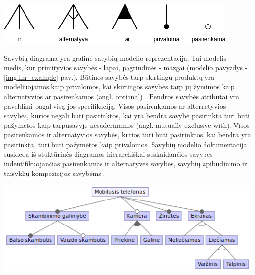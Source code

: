 \documentclass{VUMIFPSkursinis}
\begin{document}
\pagebreak

\begin{center}
    \includegraphics[scale=0.75]{img/feature_model_rules}
    \label{img:fm_rules}

\end{center}

Savybių diagrama yra grafinė savybių modelio reprezentacija. Tai modelis - medis, kur primityvios savybės - lapai, pagrindinės - mazgai (modelio pavyzdys - \ref{img:fm_example} pav.). Būtinos savybės tarp skirtingų produktų yra modeliuojamos kaip privalomos, kai skirtingos savybės tarp jų žymimos kaip alternatyvios ar pasirenkamos (angl. optional) \cite{Batory2005}. Bendros savybės atributai yra paveldimi pagal visą jos specifikaciją. Visos pasirenkamos ar alternetyvios savybės, kurios negali būti pasirinktos, kai yra bendra savybė pasirinkta turi būti pažymėtos kaip tarpusavyje nesuderinamos (angl. mutually exclusive with). Visos pasirenkamos ir alternatyvios savybės, kurios turi būti pasirinktos, kai bendra yra pasirinkta, turi būti pažymėtos kaip privalomos. Savybių modelio dokumentacija susideda iš stuktūrinės diagramos hierarchiškai suskaidančios savybes indentifikuojančias pasirenkamas ir alternatyves savybes, savybių apibūdinimo ir taisyklių kompozicijos savybėms \cite{Kang1990}. 

\begin{center}
    \includegraphics[scale=0.6]{img/mobile}
    \label{img:fm_example}
\end{center}
\end{document}
